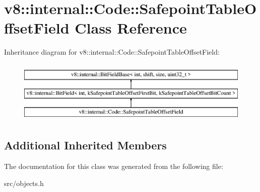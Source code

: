 \hypertarget{classv8_1_1internal_1_1_code_1_1_safepoint_table_offset_field}{}\section{v8\+:\+:internal\+:\+:Code\+:\+:Safepoint\+Table\+Offset\+Field Class Reference}
\label{classv8_1_1internal_1_1_code_1_1_safepoint_table_offset_field}
Inheritance diagram for v8\+:\+:internal\+:\+:Code\+:\+:Safepoint\+Table\+Offset\+Field\+:\begin{figure}[H]
\begin{center}
\leavevmode
\includegraphics[height=3.000000cm]{classv8_1_1internal_1_1_code_1_1_safepoint_table_offset_field}
\end{center}
\end{figure}
\subsection*{Additional Inherited Members}


The documentation for this class was generated from the following file\+:\begin{DoxyCompactItemize}
\item 
src/objects.\+h\end{DoxyCompactItemize}
